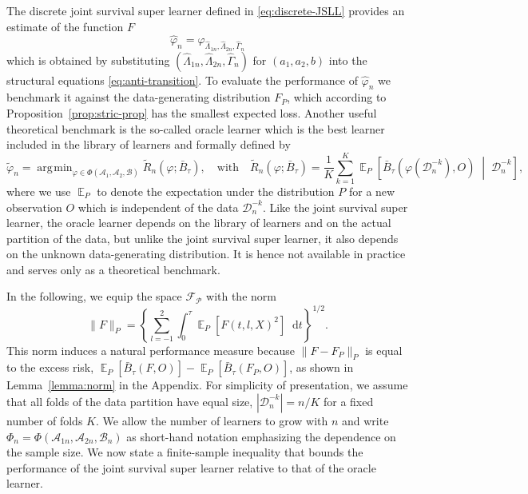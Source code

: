 \documentclass[alpha-refs]{wiley-article}
\DeclareMathOperator{\E}{\mathbb{E}} %
\renewcommand{\phi}{\varphi}
\newcommand*\diff{\mathop{}\!\mathrm{d}}
\newcommand{\midd}{\; \middle|\;}
\newcommand{\1}{\mathbb{1}} %
\DeclareMathOperator*{\argmin}{\arg\!\min}
\newcommand{\data}{\ensuremath{\mathcal{D}}}
\begin{document}
The discrete joint survival super learner defined in
\eqref{eq:discrete-JSLL} provides an estimate of the function \(F\)
\begin{equation*}
  \hat{\phi}_n=\phi_{\hat \Lambda_{1n},\hat \Lambda_{2n}, \hat \Gamma_{n}}
\end{equation*}
which is obtained by substituting
\((\hat \Lambda_{1n},\hat \Lambda_{2n}, \hat \Gamma_{n})\) for
\((a_1,a_2,b)\) into the structural equations
\eqref{eq:anti-transition}. To evaluate the performance of
\(\hat{\phi}_n\) we benchmark it against the data-generating
distribution \( F_P \), which according to
Proposition~\ref{prop:stric-prop} has the smallest expected
loss. Another useful theoretical benchmark is the so-called oracle
learner which is the best learner included in the library of learners
and formally defined by
\begin{equation*}
  \tilde{\phi}_n
  =  \argmin_{\phi \in \Phi(\mathcal{A}_1, \mathcal{A}_2, \mathcal{B}) }
  \tilde{R}_{n}(\phi ; \bar{B}_{\tau}),
  \quad \text{with} \quad 
  \tilde{R}_n(\phi; \bar{B}_{\tau})=
  \frac{1}{K}\sum_{k=1}^{K} 
  \E_P{
    \left[
      \bar{B}_{\tau}
      {
        \left(
          \phi{ (\data_n^{-k})}
          , O
        \right)
      } 
      \midd  \data_n^{-k}
    \right]}
  ,
\end{equation*}
where we use \( \E_P \) to denote the expectation
under the distribution \( P \) for a new observation \( O \) which is
independent of the data \( \data_n^{-k} \). Like the joint survival
super learner, the oracle learner depends on the library of learners
and on the actual partition of the data, but unlike the joint survival
super learner, it also depends on the unknown data-generating
distribution. It is hence not available in practice and serves only as
a theoretical benchmark.

In the following, we equip the space \( \mathcal{F}_{\mathcal{P}} \)
with the norm
\begin{equation}
  \label{eq:norm}
  \| F \|_{P} = 
  \left\{
    \sum_{l=-1}^{2}
    \int_0^{\tau} \E_P{\left[ F(t, l, X)^2 \right]} \diff t
  \right\}^{1/2}.
\end{equation}
This norm induces a natural performance measure because
$\| F-F_P \|_{P}$ is equal to the excess risk,
\( \E_P{[\bar{B}_\tau(F, O)]} - \E_P{[\bar{B}_\tau(F_P, O)]} \), as
shown in Lemma~\ref{lemma:norm} in the Appendix. For simplicity of
presentation, we assume that all folds of the data partition have
equal size, \( |\data_n^{-k}| = n/K \) for a fixed number of folds
\( K \). We allow the number of learners to grow with \( n \) and
write
\( \Phi_n=\Phi(\mathcal{A}_{1n}, \mathcal{A}_{2n},
\mathcal{B}_n)\) as short-hand notation emphasizing the dependence on
the sample size. We now state a finite-sample inequality that bounds
the performance of the joint survival super learner relative to that
of the oracle learner.
\end{document}
